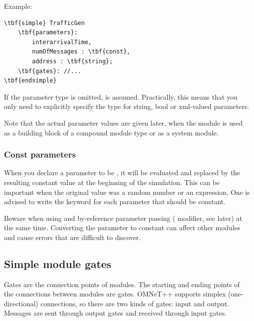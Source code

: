 Example:

\begin{Verbatim}[commandchars=\\\{\}]
\tbf{simple} TrafficGen
    \tbf{parameters}:
        interarrivalTime,
        numOfMessages : \tbf{const},
        address : \tbf{string};
    \tbf{gates}: //...
\tbf{endsimple}
\end{Verbatim}

If the parameter type is omitted, 
is assumed. Practically, this means that you only need to explicitly
specify the type for string, bool or xml-valued parameters.

Note that the actual parameter values are given later, when the module
is used as a building block of a compound module type or as a system
module.


\subsubsection{Const parameters}
\label{sec:ch-ned-lang:const}

When you declare a parameter to be ,
it will be evaluated and replaced by the resulting constant value
at the beginning of the simulation. This can be important when the
original value was a random number or an
expression. One is advised to write the
 keyword for each parameter that
should be constant.

Beware when using  and by-reference
parameter passing ( modifier, see later)
at the same time. Converting the parameter to constant can affect
other modules and cause errors that are difficult to discover.




\subsection{Simple module gates}
\label{sec:ch-ned-lang:simple-module-gates}


Gates are the connection points of modules. The starting and
ending points of the connections between modules are gates. OMNeT++
supports simplex (one-directional) connections, so there are
two kinds of gates: input and output. Messages are sent through
output gates and received through input gates.

